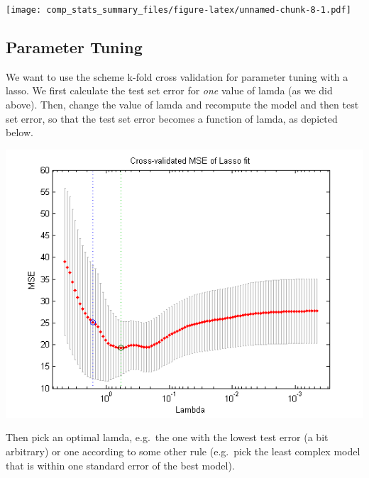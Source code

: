\documentclass[]{book}
\begin{document}
\texttt{[image: comp\_stats\_summary\_files/figure-latex/unnamed-chunk-8-1.pdf]}

\subsection{Parameter Tuning}\label{parameter-tuning}

We want to use the scheme k-fold cross validation for parameter tuning
with a lasso. We first calculate the test set error for \emph{one} value
of lamda (as we did above). Then, change the value of lamda and
recompute the model and then test set error, so that the test set error
becomes a function of lamda, as depicted below.

\includegraphics[width=650px]{figures/lasso_cv}

Then pick an optimal lamda, e.g.~the one with the lowest test error (a
bit arbitrary) or one according to some other rule (e.g.~pick the least
complex model that is within one standard error of the best model).
\end{document}
